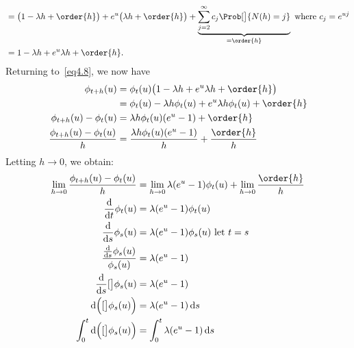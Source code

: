 \begin{Result}
\begin{align*}
         & =\bigl(1-\lambda h+\order{h}\bigr)+e^{u}
        \bigl(\lambda h+\order{h}\bigr)+\underbrace{\sum_{j=2}^{\infty}c_j\Prob[\big]{N(h)=j}}_{=\order{h}}\text{ where $c_j=e^{uj}$} \\
         & =1-\lambda h+e^{u}\lambda h+\order{h}.
    \end{align*}
    Returning to~\ref{eq4.8}, we now have
    \begin{align*}
        \phi_{t+h}(u)
                                          & =\phi_t(u)\bigl(1-\lambda h+e^{u}\lambda h+\order{h}\bigr)     \\
                                          & =\phi_t(u)-\lambda h\phi_t(u)+e^u \lambda h\phi_t(u)+\order{h} \\
        \phi_{t+h}(u)-\phi_t(u)           & =\lambda h \phi_t(u)(e^u-1)+\order{h}                          \\
        \frac{\phi_{t+h}(u)-\phi_t(u)}{h} & =\frac{\lambda h\phi_t(u)(e^u-1)}{h}+\frac{\order{h}}{h}
    \end{align*}
    Letting $ h\to 0 $, we obtain:
    \begin{align*}
        \lim\limits_{{h} \to {0}}\frac{\phi_{t+h}(u)-\phi_t(u)}{h} & =\lim\limits_{{h} \to {0}}\lambda (e^u-1)\phi_t(u)+\lim\limits_{{h} \to {0}}\frac{\order{h}}{h} \\
        \odv*{\phi_t(u)}{t}                                        & =\lambda(e^u-1)\phi_t(u)                                                                        \\
        \odv*{\phi_s(u)}{s}                                        & =\lambda(e^u-1)\phi_s(u)\text{ let $t=s$}                                                       \\
        \frac{\odv*{\phi_s(u)}{s} }{\phi_s(u)}                     & =\lambda(e^u-1)                                                                                 \\
        \odv*{\ln[\big]{\phi_s(u)}}{s}                             & =\lambda (e^u-1)                                                                                \\
        \odif{\Bigl(\ln[\big]{\phi_s(u)}\Bigr)}                    & =\lambda(e^{u}-1)\odif{s}                                                                       \\
        \int_{0}^{t}\odif{\Bigl(\ln[\big]{\phi_s(u)}\Bigr)}        & =\int_{0}^{t}\lambda (e^u-1)\odif{s}                                                            \\

\end{align*}
\end{Result}
